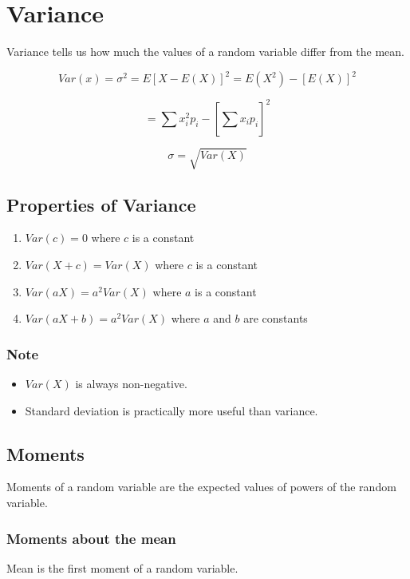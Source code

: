 \documentclass[english,course]{lecture}
\begin{document}
\section{Variance}

Variance tells us how much the values of a random variable differ from the mean.

\[
  Var(x) = \sigma^2 = E[X - E(X)]^2 = E(X^2) - [E(X)]^2
\]

\[
  = \sum_{}^{}x_i^2 p_i - [\sum_{}^{}x_i p_i]^2
\]

\[
  \sigma = \sqrt{Var(X)}
\]

\subsection{Properties of Variance}

\begin{enumerate}
  \item $Var(c) = 0$ where $c$ is a constant
  \item $Var(X + c) = Var(X)$ where $c$ is a constant
  \item $Var(aX) = a^2 Var(X)$ where $a$ is a constant
  \item $Var(aX + b) = a^2 Var(X)$ where $a$ and $b$ are constants
\end{enumerate}

\subsubsection*{Note}

\begin{itemize}
  \item $Var(X)$ is always non-negative.
  \item Standard deviation is practically more useful than variance.
\end{itemize}

\subsection{Moments}

Moments of a random variable are the expected values of powers of the random variable.

\subsubsection{Moments about the mean}

Mean is the first moment of a random variable.
\end{document}
